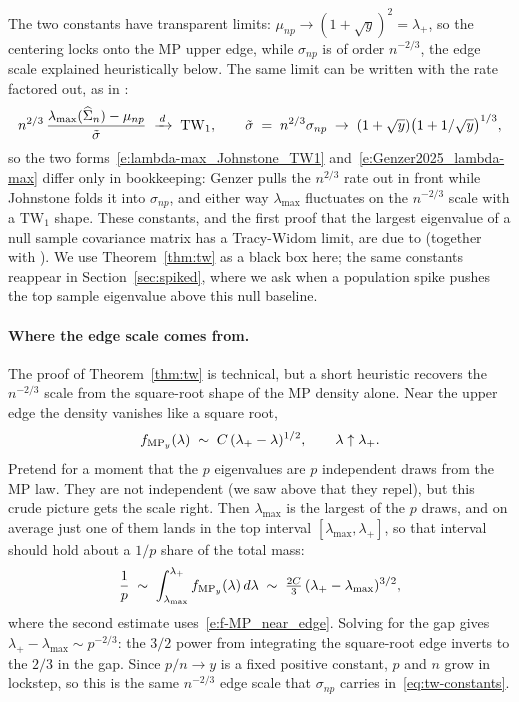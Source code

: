 The two constants have transparent limits: \(\mu_{n p} \to (1 + \sqrt{y})^2 = \lambda_+\), so the centering locks onto the MP upper edge, while \(\sigma_{n p}\) is of order \(n^{-2/3}\), the edge scale explained heuristically below. The same limit can be written with the rate factored out, as in \citet[][Prop.~3.9]{Genzer2025}:
\begin{equation}
  n^{2/3}\,\frac{\lambda_{\max}(\widehat{\Sigma}_n) - \mu_{n p}}{\tilde\sigma} \;\xrightarrow{\,d\,}\; \mathrm{TW}_1, \qquad \tilde\sigma \;=\; n^{2/3} \sigma_{n p} \;\to\; (1 + \sqrt{y})\bigl(1 + 1/\sqrt{y}\bigr)^{1/3},
  \label{e:Genzer2025_lambda-max}
\end{equation}
so the two forms~\eqref{e:lambda-max_Johnstone_TW1} and~\eqref{e:Genzer2025_lambda-max} differ only in bookkeeping: Genzer pulls the \(n^{2/3}\) rate out in front while Johnstone folds it into \(\sigma_{n p}\), and either way \(\lambda_{\max}\) fluctuates on the \(n^{-2/3}\) scale with a \(\mathrm{TW}_1\) shape. These constants, and the first proof that the largest eigenvalue of a null sample covariance matrix has a Tracy-Widom limit, are due to \citet{Johnstone2001} (together with \citealp{Johansson2000}). We use Theorem~\ref{thm:tw} as a black box here; the same constants reappear in Section~\ref{sec:spiked}, where we ask when a population spike pushes the top sample eigenvalue above this null baseline.

\paragraph{Where the edge scale comes from.}
The proof of Theorem~\ref{thm:tw} is technical, but a short heuristic recovers the \(n^{-2/3}\) scale from the square-root shape of the MP density alone. Near the upper edge the density vanishes like a square root,
\begin{equation}
  f_{\mathrm{MP}_y}(\lambda) \;\sim\; C\,(\lambda_+ - \lambda)^{1/2}, \qquad \lambda \uparrow \lambda_+.
  \label{e:f-MP_near_edge}
\end{equation}
Pretend for a moment that the \(p\) eigenvalues are \(p\) independent draws from the MP law. They are not independent (we saw above that they repel), but this crude picture gets the scale right. Then \(\lambda_{\max}\) is the largest of the \(p\) draws, and on average just one of them lands in the top interval \([\lambda_{\max}, \lambda_+]\), so that interval should hold about a \(1/p\) share of the total mass:
\begin{equation}
  \frac{1}{p} \;\sim\; \int_{\lambda_{\max}}^{\lambda_+} f_{\mathrm{MP}_y}(\lambda)\, d\lambda \;\sim\; \tfrac{2 C}{3}\, (\lambda_+ - \lambda_{\max})^{3/2},
  \label{e:f-MP-near_edge_scaling}
\end{equation}
where the second estimate uses~\eqref{e:f-MP_near_edge}. Solving for the gap gives \(\lambda_+ - \lambda_{\max} \sim p^{-2/3}\): the \(3/2\) power from integrating the square-root edge inverts to the \(2/3\) in the gap. Since \(p / n \to y\) is a fixed positive constant, \(p\) and \(n\) grow in lockstep, so this is the same \(n^{-2/3}\) edge scale that \(\sigma_{n p}\) carries in~\eqref{eq:tw-constants}.


